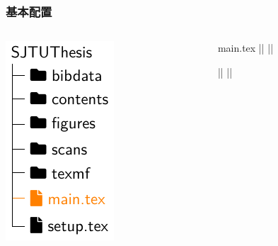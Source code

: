 \begin{frame}[fragile]
  \frametitle{基本配置}
  \begin{columns}
    \begin{column}{0.35\textwidth}
      \includegraphics[page=2]{support/figures/thesisdir.pdf}
    \end{column}
    \begin{column}{0.65\textwidth}



      \begin{codeblock}[firstnumber=12]{main.tex}
||%
||




||%
||\maketitle
      \end{codeblock}
    \end{column}
  \end{columns}
\end{frame}

